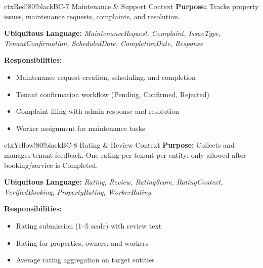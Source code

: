 \documentclass[12pt,a4paper]{article}
\begin{document}
\begin{contextbox}{ctxRed!80!black}{BC-7 \quad Maintenance \& Support Context}
\textbf{Purpose:} Tracks property issues, maintenance requests, complaints, and resolution.

\textbf{Ubiquitous Language:} \textit{MaintenanceRequest, Complaint, IssueType, TenantConfirmation, ScheduledDate, CompletionDate, Response}

\textbf{Responsibilities:}
\begin{itemize}
  \item Maintenance request creation, scheduling, and completion
  \item Tenant confirmation workflow (Pending, Confirmed, Rejected)
  \item Complaint filing with admin response and resolution
  \item Worker assignment for maintenance tasks
\end{itemize}
\end{contextbox}

\vspace{0.5em}

\begin{contextbox}{ctxYellow!80!black}{BC-8 \quad Rating \& Review Context}
\textbf{Purpose:} Collects and manages tenant feedback. One rating per tenant per entity; only allowed after booking/service is Completed.

\textbf{Ubiquitous Language:} \textit{Rating, Review, RatingScore, RatingContext, VerifiedBooking, PropertyRating, WorkerRating}

\textbf{Responsibilities:}
\begin{itemize}
  \item Rating submission (1--5 scale) with review text
  \item Rating for properties, owners, and workers
  \item Average rating aggregation on target entities
\end{itemize}
\end{contextbox}

\vspace{0.5em}
\end{document}
